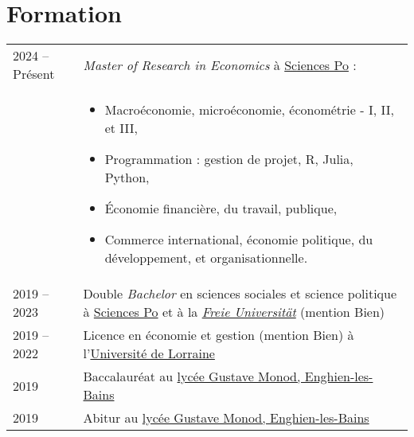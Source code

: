 \documentclass[a4paper,12pt]{article}
\begin{document}
\section{Formation}
\begin{tabularx}{\linewidth}{@{}l X@{}}	

2024 – Présent & \textit{Master of Research in Economics} à \href{https://www.sciencespo.fr/en/}{Sciences Po} : \\ 
& \begin{itemize}
    \item Macroéconomie, microéconomie, économétrie - I, II, et III,
    \item Programmation : gestion de projet, R, Julia, Python,
    \item Économie financière, du travail, publique,
    \item Commerce international, économie politique, du développement, et organisationnelle.
\end{itemize} \\

2019 – 2023 & Double \textit{Bachelor} en sciences sociales et science politique à \href{https://www.sciencespo.fr/en/}{Sciences Po} et à la \textit{\href{https://www.fu-berlin.de/en/index.html}{Freie Universität}} (mention Bien)\\

2019 – 2022 & Licence en économie et gestion (mention Bien) à l'\href{https://www.univ-lorraine.fr/en/}{Université de Lorraine}\\

2019 & Baccalauréat au \href{https://www.lyc-polyvalent-monod-enghien.fr/}{lycée Gustave Monod, Enghien-les-Bains} \hfill \\

2019 & Abitur au \href{https://www.lyc-polyvalent-monod-enghien.fr/}{lycée Gustave Monod, Enghien-les-Bains} \hfill \\
\end{tabularx}

\end{document}
